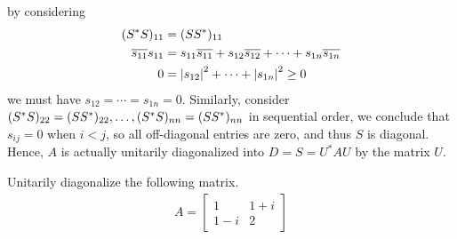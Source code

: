 by considering
\begin{align*}
(S^*S)_{11} &= (SS^*)_{11} \\
\overline{s_{11}}s_{11} &= s_{11}\overline{s_{11}} + s_{12}\overline{s_{12}} + \cdots + s_{1n}\overline{s_{1n}} \\
0 &= \abs{s_{12}}^2 + \cdots + \abs{s_{1n}}^2 \geq 0
\end{align*}
we must have $s_{12} = \cdots = s_{1n} = 0$. Similarly, consider $(S^*S)_{22} = (SS^*)_{22}, \ldots, \\ (S^*S)_{nn} = (SS^*)_{nn}$ in sequential order, we conclude that $s_{ij} = 0$ when $i < j$, so all off-diagonal entries are zero, and thus $S$ is diagonal. Hence, $A$ is actually unitarily diagonalized into $D = S = U^*AU$ by the matrix $U$.

\begin{exmp}
Unitarily diagonalize the following matrix.
\begin{align*}
A =
\begin{bmatrix}
1 & 1+i \\
1-i & 2
\end{bmatrix}
\end{align*}
\end{exmp}
